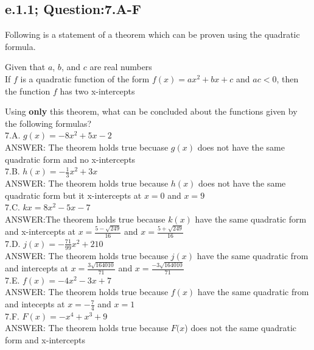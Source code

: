 \subsection{e.1.1; Question:7.A-F}

Following is a statement of a theorem which can be proven using the quadratic formula. \\
\begin{tcolorbox}
\begin{theorem}
Given that $a$, $b$, and $c$ are real numbers \\
If $f$ is a quadratic function of the form $f(x) = ax^2 + bx + c$ and $ac<0$, then the function $f$ has two x-intercepts
\end{theorem}
\end{tcolorbox}

Using {\bf only} this theorem, what can be concluded about the functions given by the following formulas? \\

7.A. $g(x) = -8x^2 +5x -2$ \\
	ANSWER: The theorem holds true becuase $g(x)$ does not have the same quadratic form and no x-intercepts \\

7.B. $h(x) = -\frac{1}{3}x^2 + 3x$ \\
	ANSWER: The theorem holds true because $h(x)$ does not have the same quadratic form but it x-intercepts at $x=0$ and $x=9$ \\

7.C. $k{x} = 8x^2 - 5x - 7$ \\
	ANSWER:The theorem holds true because $k(x)$ have the same quadratic form and x-intercepts at $x=\frac{5-\sqrt{249}}{16}$ and $x=\frac{5+\sqrt{249}}{16}$ \\

7.D. $j(x) = -\frac{71}{99}x^2 + 210$ \\
	ANSWER: The theorem holds true because $j(x)$ have the same quadratic from and intercepts at $x=\frac{3\sqrt{164010}}{71}$ and  $x=\frac{-3\sqrt{164010}}{71}$ \\

7.E. $f(x) = -4x^2 - 3x + 7$ \\
	ANSWER: The theorem holds true because $f(x)$ have the same quadratic from and intecepts at $x=-\frac{7}{4}$ and $x=1$ \\

7.F. $F(x) = -x^4 + x^3 + 9$ \\
	ANSWER: The theorem holds true because $F(x$) does not the same quadratic form and x-intercepts \\


